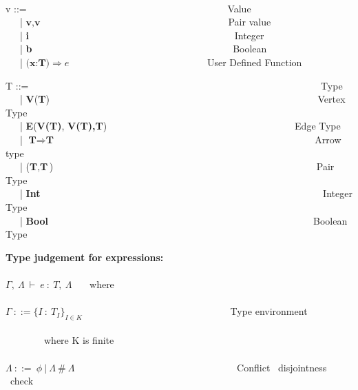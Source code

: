 \begin{frame}
{\ \\
  v ::= \ \ \ \ \ \ \ \ \ \ \ \ \ \ \ \ \ \ \ \ \ \ \ \ \ \ \ \ \ \ \ \ \ \ \ \ \ \ \ \ \ Value \\
    \ \ \ | $\textbf{v},\textbf{v}$ \ \ \ \ \ \ \ \ \ \ \ \ \ \ \ \ \ \ \ \ \ \ \ \ \ \ \ \ \ \ \ \ \ \ \ \ \ \ Pair value \\
    \ \ \ | \textbf{i} \ \ \ \ \ \ \ \ \ \ \ \ \ \ \ \  \ \ \ \ \ \ \ \ \ \ \ \ \ \ \ \ \ \ \ \ \ \ \ \ \ \ Integer \\
    \ \ \ | \textbf{b} \ \ \ \ \ \ \ \ \ \ \ \ \ \ \ \ \ \ \ \ \ \ \ \ \ \ \ \ \ \ \ \ \ \ \ \ \ \ \ \ \ Boolean \\
    \ \ \ | $\textbf{(x:T)} \Rightarrow e $ \ \ \ \ \ \ \ \ \ \ \ \ \ \ \ \ \ \ \ \ \ \ \ \ \ \ \ \  User Defined Function \\
    }
\end{frame}

\begin{frame}
  \tiny{
  T ::= \ \ \ \ \ \ \ \ \ \ \ \ \ \ \ \ \ \ \ \ \ \ \ \ \ \ \ \ \ \ \ \ \ \ \ \ \ \ \ \ \ \ \ \ \ \ \ \ \ \ \ \ \ \ \ \ \ \ \ \ Type \\
    \ \ \ | \textbf{V}(\textbf{T}) \ \ \ \ \ \ \ \ \ \ \ \ \ \ \ \ \ \ \ \ \ \ \ \ \ \ \ \ \ \ \ \ \ \ \ \ \ \ \ \ \ \ \ \ \ \ \ \ \ \ \ \ \ \ \ Vertex Type \\
    \ \ \ | \textbf{E}(\textbf{V(T)}, \textbf{V(T),}\textbf{T})\ \ \ \ \ \ \ \ \ \ \ \ \ \ \ \ \ \ \ \ \ \ \ \ \ \ \ \ \ \ \ \ \ \ \ \ \ \ \  Edge Type\\
    \ \ \ | $\textbf{T} \Rightarrow \textbf{T}$ \ \ \ \ \ \ \ \ \ \  \ \ \ \ \ \ \ \ \ \ \ \ \ \ \ \ \ \ \ \ \ \ \ \ \ \ \ \ \ \  \ \ \ \ \ \ \ \ \ \ \ \ \ Arrow type \\
    \ \ \ | ($\textbf{T}, \textbf{T}$) \ \ \ \ \ \ \ \ \ \ \ \ \ \ \ \ \ \ \ \ \ \ \ \ \ \ \ \ \ \ \ \ \ \ \ \ \ \ \ \ \ \ \ \ \ \ \ \ \ \ \ \ \ \ Pair Type \\
    \ \ \ | \textbf{Int} \ \ \ \ \ \ \ \ \ \ \ \ \ \ \ \ \ \ \ \ \ \ \ \ \ \ \ \ \ \ \ \ \ \ \ \ \ \ \ \ \ \ \ \ \ \ \ \ \ \ \ \ \ \ \ \ \ \ Integer Type \\
    \ \ \ | \textbf{Bool}\ \ \ \ \ \ \ \ \ \ \ \  \ \ \ \ \ \ \ \ \ \ \ \ \ \ \ \ \ \ \ \ \ \ \ \ \ \ \ \ \ \ \ \ \ \ \ \ \ \ \ \ \ \ \  Boolean Type
}
\newline
\newline

  \tiny{
  \textbf{Type judgement for expressions:}
  \\ \ \\
  $\Gamma, \ \Lambda \ \vdash \ e \ : \ T, \ \Lambda$ \ \ \  where \\ \ \\
  $\Gamma \ ::= {\{ I \ : \ T_I \}}_{I \in K}$ \ \ \ \ \ \ \ \ \ \ \ \ \ \ \ \ \ \ \ \ \ \ \ \ \ \ \ \ \ \ Type environment\\ \ \\
  \ \ \ \ \ \ \ \ where K is finite \\
  \ \\ $\Lambda \ ::= \ \phi \ | \ \Lambda \ \# \ \Lambda$ \ \ \ \ \ \ \ \ \ \ \ \ \ \ \ \ \ \ \ \ \ \ \ \ \ \ \ \ \ \ \ \ \ Conflict \ disjointness \ check
  }
\end{frame}

